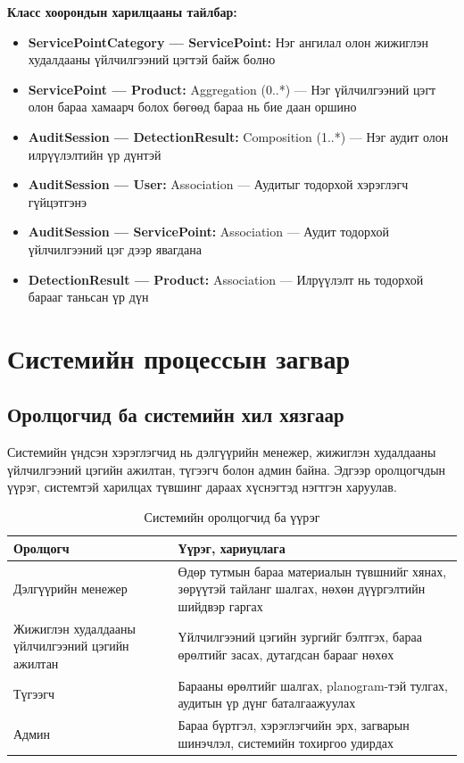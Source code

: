 \textbf{Класс хоорондын харилцааны тайлбар:}

\begin{itemize}
    \item \textbf{ServicePointCategory --- ServicePoint:} Нэг ангилал олон жижиглэн худалдааны үйлчилгээний цэгтэй байж болно
    \item \textbf{ServicePoint --- Product:} Aggregation (0..*) --- Нэг үйлчилгээний цэгт олон бараа хамаарч болох бөгөөд бараа нь бие даан оршино
    \item \textbf{AuditSession --- DetectionResult:} Composition (1..*) --- Нэг аудит олон илрүүлэлтийн үр дүнтэй
    \item \textbf{AuditSession --- User:} Association --- Аудитыг тодорхой хэрэглэгч гүйцэтгэнэ
    \item \textbf{AuditSession --- ServicePoint:} Association --- Аудит тодорхой үйлчилгээний цэг дээр явагдана
    \item \textbf{DetectionResult --- Product:} Association --- Илрүүлэлт нь тодорхой барааг таньсан үр дүн
\end{itemize}

\section{Системийн процессын загвар}

\subsection{Оролцогчид ба системийн хил хязгаар}

Системийн үндсэн хэрэглэгчид нь дэлгүүрийн менежер, жижиглэн худалдааны үйлчилгээний цэгийн ажилтан, түгээгч болон админ байна. Эдгээр оролцогчдын үүрэг, системтэй харилцах түвшинг дараах хүснэгтэд нэгтгэн харуулав.

\begin{longtable}{|p{3.5cm}|p{10cm}|}
\caption{Системийн оролцогчид ба үүрэг}
\label{tab:system_actors} \\
\hline
\textbf{Оролцогч} & \textbf{Үүрэг, хариуцлага} \\
\hline
Дэлгүүрийн менежер & Өдөр тутмын бараа материалын түвшнийг хянах, зөрүүтэй тайланг шалгах, нөхөн дүүргэлтийн шийдвэр гаргах \\
\hline
Жижиглэн худалдааны үйлчилгээний цэгийн ажилтан & Үйлчилгээний цэгийн зургийг бэлтгэх, бараа өрөлтийг засах, дутагдсан барааг нөхөх \\
\hline
Түгээгч & Барааны өрөлтийг шалгах, planogram-тэй тулгах, аудитын үр дүнг баталгаажуулах \\
\hline
Админ & Бараа бүртгэл, хэрэглэгчийн эрх, загварын шинэчлэл, системийн тохиргоо удирдах \\
\hline
\end{longtable}

